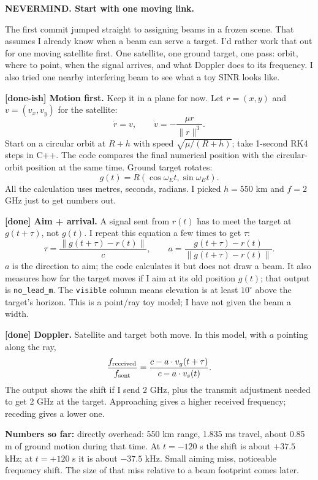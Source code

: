 \documentclass{article}
\begin{document}
\noindent\textbf{NEVERMIND. Start with one moving link.}

The first commit jumped straight to assigning beams in a frozen scene. That assumes I already know when a beam can serve a target. I'd rather work that out for one moving satellite first. One satellite, one ground target, one pass: orbit, where to point, when the signal arrives, and what Doppler does to its frequency. I also tried one nearby interfering beam to see what a toy SINR looks like.

\medskip
\noindent\textbf{[done-ish] Motion first.} Keep it in a plane for now. Let $r=(x,y)$ and $v=(v_x,v_y)$ for the satellite:
\[
\dot r=v,\qquad \dot v=-\frac{\mu r}{\lVert r\rVert^3}.
\]
Start on a circular orbit at $R+h$ with speed $\sqrt{\mu/(R+h)}$; take 1-second RK4 steps in C++. The code compares the final numerical position with the circular-orbit position at the same time. Ground target rotates:
\[
 g(t)=R(\cos\omega_E t,\sin\omega_E t).
\]
All the calculation uses metres, seconds, radians. I picked $h=550$ km and $f=2$ GHz just to get numbers out.

\medskip
\noindent\textbf{[done] Aim + arrival.} A signal sent from $r(t)$ has to meet the target at $g(t+\tau)$, not $g(t)$. I repeat this equation a few times to get $\tau$:
\[
\tau=\frac{\lVert g(t+\tau)-r(t)\rVert}{c},\qquad
 a=\frac{g(t+\tau)-r(t)}{\lVert g(t+\tau)-r(t)\rVert}.
\]
$a$ is the direction to aim; the code calculates it but does not draw a beam. It also measures how far the target moves if I aim at its old position $g(t)$; that output is \texttt{no\_lead\_m}. The \texttt{visible} column means elevation is at least $10^\circ$ above the target's horizon. This is a point/ray toy model; I have not given the beam a width.

\medskip
\noindent\textbf{[done] Doppler.} Satellite and target both move. In this model, with $a$ pointing along the ray,
\[
\frac{f_{\rm received}}{f_{\rm sent}}=
\frac{c-a\cdot v_g(t+\tau)}{c-a\cdot v_s(t)}.
\]
The output shows the shift if I send 2 GHz, plus the transmit adjustment needed to get 2 GHz at the target. Approaching gives a higher received frequency; receding gives a lower one.

\medskip
\noindent\textbf{Numbers so far:} directly overhead: 550 km range, 1.835 ms travel, about 0.85 m of ground motion during that time. At $t=-120$ s the shift is about $+37.5$ kHz; at $t=+120$ s it is about $-37.5$ kHz. Small aiming miss, noticeable frequency shift. The size of that miss relative to a beam footprint comes later.
\end{document}
